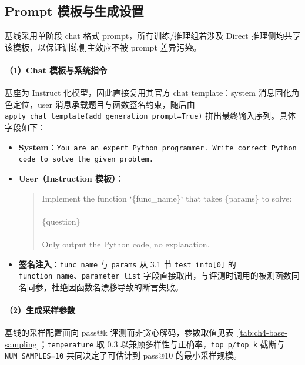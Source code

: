 \subsection{Prompt 模板与生成设置}

基线采用单阶段 chat 格式 prompt，所有训练/推理组若涉及 Direct 推理侧均共享该模板，以保证训练侧主效应不被 prompt 差异污染。

\paragraph{（1）Chat 模板与系统指令}
基座为 Instruct 化模型，因此直接复用其官方 chat template：system 消息固化角色定位，user 消息承载题目与函数签名约束，随后由 \texttt{apply\_chat\_template(add\_generation\_prompt=True)} 拼出最终输入序列。具体字段如下：
\begin{itemize}
    \item \textbf{System}：\texttt{You are an expert Python programmer. Write correct Python code to solve the given problem.}
    \item \textbf{User（Instruction 模板）}：
\begin{quote}\footnotesize\ttfamily
Implement the function `\{func\_name\}` that takes \{params\} to solve:\\
\\
\{question\}\\
\\
Only output the Python code, no explanation.
\end{quote}
    \item \textbf{签名注入}：\texttt{func\_name} 与 \texttt{params} 从 3.1 节 \texttt{test\_info[0]} 的 \texttt{function\_name}、\texttt{parameter\_list} 字段直接取出，与评测时调用的被测函数同名同参，杜绝因函数名漂移导致的断言失败。
\end{itemize}

\paragraph{（2）生成采样参数}
基线的采样配置面向 pass@k 评测而非贪心解码，参数取值见表~\ref{tab:ch4-base-sampling}；\texttt{temperature} 取 0.3 以兼顾多样性与正确率，\texttt{top\_p/top\_k} 截断与 \texttt{NUM\_SAMPLES=10} 共同决定了可估计到 pass@10 的最小采样规模。

